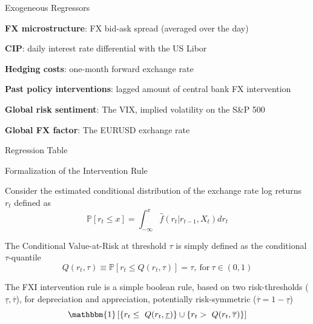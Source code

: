 \documentclass{beamer}
\newenvironment{largeitemize}{\itemize\addtolength{\itemsep}{10pt}}{\enditemize}
\newenvironment{largeenumerate}{\enumerate\addtolength{\itemsep}{10pt}}{\endenumerate}
\begin{document}
\begin{frame}{Exogeneous Regressors}
  \begin{largeenumerate}
  \item \textbf{FX microstructure}: FX bid-ask spread (averaged over the day)
  \item \textbf{CIP}: daily interest rate differential with the US Libor 
  \item \textbf{Hedging costs}: one-month forward exchange rate
  \item \textbf{Past policy interventions}: lagged amount of central bank FX intervention 
  \item \textbf{Global risk sentiment}: The VIX, implied volatility on the S\&P 500 
  \item \textbf{Global FX factor}: The EURUSD exchange rate
  \end{largeenumerate}
 
\end{frame}


\begin{frame}{Regression Table}
\setlength\tabcolsep{2pt}  %
\tiny  %

\normalsize
\end{frame}

\begin{frame}{Formalization of the Intervention Rule}
  \begin{largeitemize}
    \item Consider the estimated conditional distribution of the exchange rate log
      returns $r_t$ defined as
      \begin{equation*}
      \mathbb{P}[r_t \leq x] = \int_{-\infty}^{x}\hat{f}(r_t | r_{t-1}, X_t)
      dr_t        
      \end{equation*}
    \item The Conditional Value-at-Risk at threshold $\tau$ is simply defined as
      the conditional $\tau$-quantile
      \begin{equation*}
      Q(r_t, \tau) \equiv  \mathbb{P}[r_t
      \leq Q(r_t, \tau)] = \tau, \ \text{for} \ \tau \in (0,1)
      \end{equation*}        
    \item The FXI intervention rule is a simple boolean rule, based on two
      risk-thresholds ($\underline{\tau}, \overline{\tau}$), for depreciation
      and appreciation, potentially risk-symmetric ($\overline{\tau} = 1 - \underline{\tau}$)
      \begin{equation*}
\mathbbm{1} \left[ \{r_t \leq \ Q(r_t, \underline{\tau})\} \cup \{r_t > \
  Q(r_t, \overline{\tau})\} \right]
      \end{equation*}                
  \end{largeitemize}
  
\end{frame}
\end{document}
